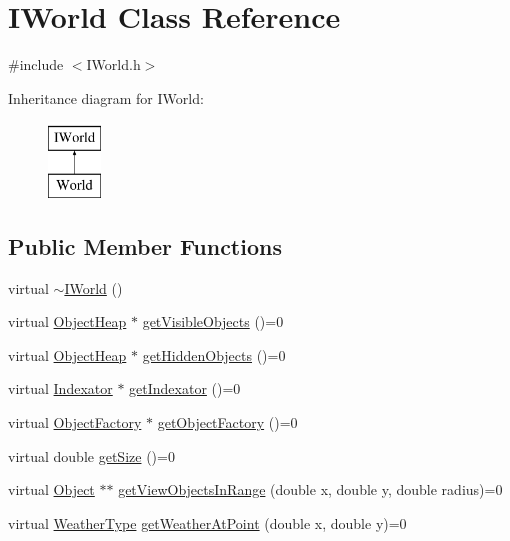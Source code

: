 \hypertarget{classIWorld}{\section{I\-World Class Reference}
\label{classIWorld}
}


{\ttfamily \#include $<$I\-World.\-h$>$}

Inheritance diagram for I\-World\-:\begin{figure}[H]
\begin{center}
\leavevmode
\includegraphics[height=2.000000cm]{classIWorld}
\end{center}
\end{figure}
\subsection*{Public Member Functions}
\begin{DoxyCompactItemize}
\item 
virtual \hyperlink{classIWorld_ab9a7fe6708d136457f27be89629143ed}{$\sim$\-I\-World} ()
\item 
virtual \hyperlink{classObjectHeap}{Object\-Heap} $\ast$ \hyperlink{classIWorld_aae71f283d70ad9f267d6731683e6ab7e}{get\-Visible\-Objects} ()=0
\item 
virtual \hyperlink{classObjectHeap}{Object\-Heap} $\ast$ \hyperlink{classIWorld_a1adf8090134ff1742c99b0dacd46b276}{get\-Hidden\-Objects} ()=0
\item 
virtual \hyperlink{classIndexator}{Indexator} $\ast$ \hyperlink{classIWorld_a75233893bfd7288b9e7306e08eb2a39d}{get\-Indexator} ()=0
\item 
virtual \hyperlink{classObjectFactory}{Object\-Factory} $\ast$ \hyperlink{classIWorld_a8deb54efc20b8b1d4b966fe5128c9c2b}{get\-Object\-Factory} ()=0
\item 
virtual double \hyperlink{classIWorld_a3791b170cd91f6d1a71ef958f19d2ac9}{get\-Size} ()=0
\item 
virtual \hyperlink{classObject}{Object} $\ast$$\ast$ \hyperlink{classIWorld_a7c94c8a5db44f1ae707f35e7c4fd3aef}{get\-View\-Objects\-In\-Range} (double x, double y, double radius)=0
\item 
virtual \hyperlink{BasicTypes_8h_aae2a79ad426e847c0ddfd77d04ce2516}{Weather\-Type} \hyperlink{classIWorld_ac3c29f9aba4066efbe3bbfce51030ad5}{get\-Weather\-At\-Point} (double x, double y)=0
\end{DoxyCompactItemize}


